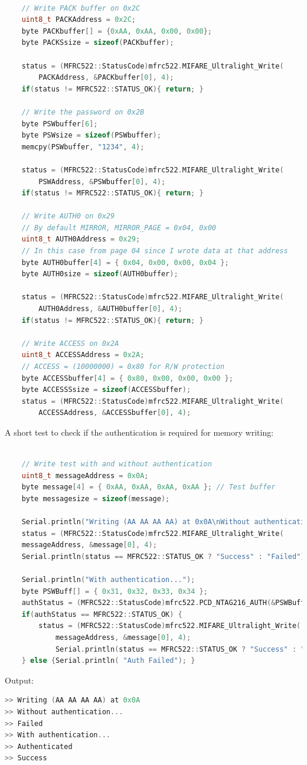 \documentclass[target=bach,aauheader=,style=]{thud}
\begin{document}
\begin{lstlisting}[language=c++, style=cpp]
	
	// Write PACK buffer on 0x2C
	uint8_t PACKAddress = 0x2C;
	byte PACKbuffer[] = {0xAA, 0xAA, 0x00, 0x00};
	byte PACKSsize = sizeof(PACKbuffer);
	
	status = (MFRC522::StatusCode)mfrc522.MIFARE_Ultralight_Write(
		PACKAddress, &PACKbuffer[0], 4);
	if(status != MFRC522::STATUS_OK){ return; }
	
	// Write the password on 0x2B
	byte PSWbuffer[6]; 
	byte PSWsize = sizeof(PSWbuffer);
	memcpy(PSWbuffer, "1234", 4);
	
	status = (MFRC522::StatusCode)mfrc522.MIFARE_Ultralight_Write(
		PSWAddress, &PSWbuffer[0], 4);
	if(status != MFRC522::STATUS_OK){ return; }
	
	// Write AUTH0 on 0x29
	// By default MIRROR, MIRROR_PAGE = 0x04, 0x00
	uint8_t AUTH0Address = 0x29;
	// In this case from page 04 since I wrote data at that address
	byte AUTH0buffer[4] = { 0x04, 0x00, 0x00, 0x04 };
	byte AUTH0size = sizeof(AUTH0buffer);
	
	status = (MFRC522::StatusCode)mfrc522.MIFARE_Ultralight_Write(
		AUTH0Address, &AUTH0buffer[0], 4);
	if(status != MFRC522::STATUS_OK){ return; }
	
	// Write ACCESS on 0x2A
	uint8_t ACCESSAddress = 0x2A;
	// ACCESS = (10000000) = 0x80 for R/W protection
	byte ACCESSbuffer[4] = { 0x80, 0x00, 0x00, 0x00 };
	byte ACCESSSsize = sizeof(ACCESSbuffer);
	status = (MFRC522::StatusCode)mfrc522.MIFARE_Ultralight_Write(
		ACCESSAddress, &ACCESSbuffer[0], 4);	
\end{lstlisting}
\newpage
A short test to check if the authentication is required for memory writing:
\begin{lstlisting}[language=c++,style=cpp]
	
	// Write test with and without authentication
	uint8_t messageAddress = 0x0A;
	byte message[4] = { 0xAA, 0xAA, 0xAA, 0xAA }; // Test buffer
	byte messagesize = sizeof(message);
	
	Serial.println("Writing (AA AA AA AA) at 0x0A\nWithout authentication...");
	status = (MFRC522::StatusCode)mfrc522.MIFARE_Ultralight_Write(
	messageAddress, &message[0], 4);
	Serial.println(status == MFRC522::STATUS_OK ? "Success" : "Failed");
	
	Serial.println("With authentication...");
	byte PSWBuff[] = { 0x31, 0x32, 0x33, 0x34 };
	authStatus = (MFRC522::StatusCode)mfrc522.PCD_NTAG216_AUTH(&PSWBuff[0], pACK);
	if(authStatus == MFRC522::STATUS_OK) {
		status = (MFRC522::StatusCode)mfrc522.MIFARE_Ultralight_Write(
			messageAddress, &message[0], 4);
			Serial.println(status == MFRC522::STATUS_OK ? "Success" : "Failed");	
	} else {Serial.println( "Auth Failed"); }
\end{lstlisting}
Output:
\begin{lstlisting}[language=c++,style=output]
>> Writing (AA AA AA AA) at 0x0A
>> Without authentication...
>> Failed
>> With authentication...
>> Authenticated
>> Success
\end{lstlisting}
\end{document}
